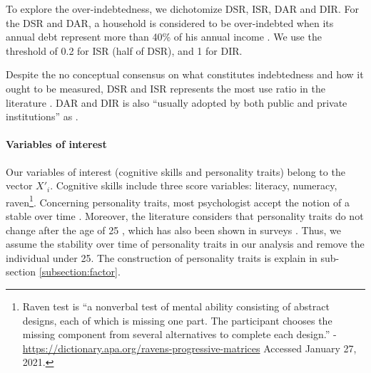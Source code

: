 \documentclass[a4paper, 11pt, onecolumn]{article}
\begin{document}
To explore the over-indebtedness, we dichotomize DSR, ISR, DAR and DIR.
For the DSR and DAR, a household is considered to be over-indebted when its annual debt represent more than 40\% of his annual income \citep{Chichaibelu2017, DAlessio2013, Bryan2010, Disney2008, Muthitacharoen2015, OXERA2004}.
We use the threshold of 0.2 for ISR (half of DSR), and 1 for DIR.


Despite the no conceptual consensus on what constitutes indebtedness and how it ought to be measured, DSR and ISR represents the most use ratio in the literature \citep{Chichaibelu2017, DAlessio2013}.%
DAR and DIR is also ``usually adopted by both public and private institutions'' \citep{Betti2007} as \cite{Disney2008, Rio2008} .



\paragraph{Variables of interest}
Our variables of interest (cognitive skills and personality traits) belong to the vector $X'_i$.
Cognitive skills include three score variables: literacy, numeracy, raven\footnote{Raven test is ``a nonverbal test of mental ability consisting of abstract designs, each of which is missing one part. The participant chooses the missing component from several alternatives to complete each design.'' - \url{https://dictionary.apa.org/ravens-progressive-matrices} Accessed January 27, 2021.}.
Concerning personality traits, most psychologist accept the notion of a stable over time \cite{Mischel1995, Mischel2008}.
Moreover, the literature considers that personality traits do not change after the age of 25 \citep{CobbClark2012}, which has also been shown in surveys \citep{CobbClark2011}.
Thus, we assume the stability over time of personality traits in our analysis and remove the individual under 25\citep{Nyhus2005, Brown2014, Heineck2010}.
The construction of personality traits is explain in sub-section \ref{subsection:factor}.
\end{document}
